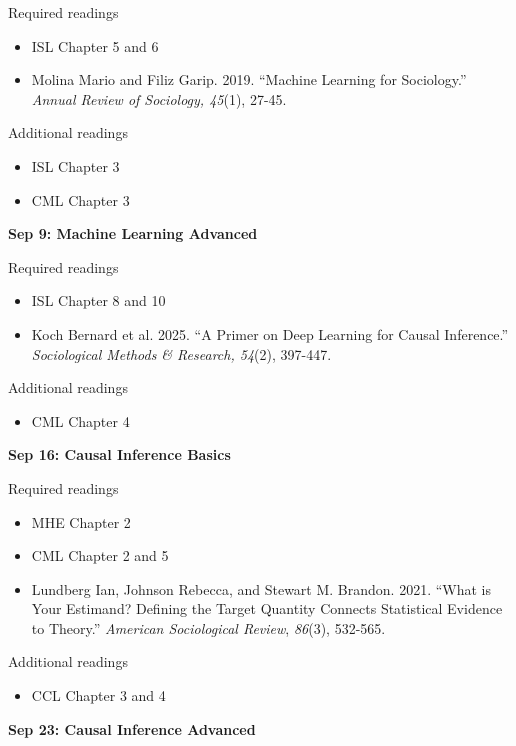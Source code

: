\documentclass[12pt]{article}
\begin{document}
\noindent Required readings
\begin{itemize}
    \item ISL Chapter 5 and 6
    \item Molina Mario and Filiz Garip. 2019. ``Machine Learning for Sociology.'' \textit{Annual Review of Sociology, 45}(1), 27-45.
\end{itemize}
\noindent Additional readings
\begin{itemize}
    \item ISL Chapter 3
    \item CML Chapter 3
\end{itemize}

\vspace{1em} \noindent \textbf{\textcolor{titlecolor}{Sep 9: Machine Learning Advanced}}

\noindent Required readings
\begin{itemize}
    \item ISL Chapter 8 and 10
    \item Koch Bernard et al. 2025. ``A Primer on Deep Learning for Causal Inference.'' \textit{Sociological Methods \& Research, 54}(2), 397-447.
\end{itemize}

\noindent Additional readings
\begin{itemize}
    \item CML Chapter 4
\end{itemize}

\vspace{1em} \noindent \textbf{\textcolor{titlecolor}{Sep 16: Causal Inference Basics}}

\noindent Required readings
\begin{itemize}
    \item MHE Chapter 2
    \item CML Chapter 2 and 5
    \item Lundberg Ian, Johnson Rebecca, and Stewart M. Brandon. 2021. ``What is Your Estimand? Defining the Target Quantity Connects Statistical Evidence to Theory.'' \textit{American Sociological Review}, \textit{86}(3), 532-565. 
\end{itemize}

\noindent Additional readings
\begin{itemize}
    \item CCL Chapter 3 and 4
\end{itemize}

\vspace{1em} \noindent \textbf{\textcolor{titlecolor}{Sep 23: Causal Inference Advanced}}
\end{document}
